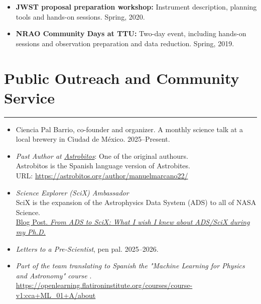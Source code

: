 \documentclass[letterpaper,10pt]{article}
\begin{document}
\begin{itemize}[label=$\blacktriangleright$]
            \item \textbf{JWST proposal preparation workshop:}  Instrument description, planning tools and hands-on sessions. Spring, 2020.

    
    
    
        \item \textbf{NRAO Community Days at TTU:}  Two-day event, including  hands-on sessions and observation preparation and data reduction. Spring, 2019.


\end{itemize}


\section*{Public Outreach and Community Service}
\hrule
\vspace{.3 cm}
\begin{itemize}[label=$\blacktriangleright$]

\item Ciencia Pal Barrio, co-founder and organizer. A monthly science talk at a local brewery in Ciudad de M\'exico. 2025--Present.


\item \emph{Past Author at \href{https://astrobitos.org/}{Astrobitos}}: One of the original authours. \\ Astrobitos is the Spanish language version of Astrobites.\\ URL: \url{https://astrobitos.org/author/manuelmarcano22/}

\item \emph{Science Explorer (SciX) Ambassador} \\
SciX is the expansion of the Astrophysics Data System (ADS) to all of NASA Science. \\
\href{https://scixplorer.org/scixblog/what-i-wish-i-knew-about-ads-scix-during-my-phd}{Blog Post. \emph{From ADS to SciX: What I wish I knew about ADS/SciX during my Ph.D.}}


\item \emph{Letters to a Pre-Scientist}, pen pal. 2025--2026.



\end{itemize}


\begin{itemize}[label=$\blacktriangleright$]

	\item \textit{Part of the team translating to Spanish the "Machine Learning for Physics and Astronomy" course }. \\
\url{https://openlearning.flatironinstitute.org/courses/course-v1:cca+ML_01+A/about}

\end{itemize}
\end{document}
